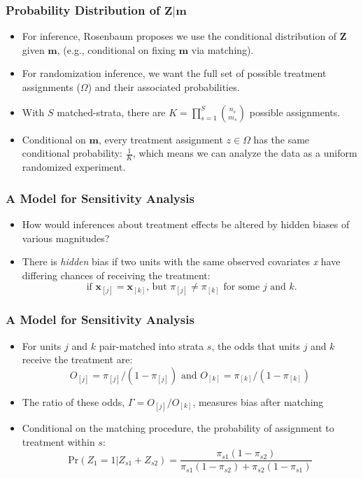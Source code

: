 \documentclass{beamer}
\begin{document}
\begin{frame}
  \frametitle{Probability Distribution of $\mathbf{Z}|\mathbf{m}$}
\begin{itemize}
\item<+-> For inference, Rosenbaum proposes we use the conditional
  distribution of $\mathbf{Z}$ given $\mathbf{m}$, (e.g., conditional on
  fixing $\mathbf{m}$ via matching).
\item<+-> For randomization inference, we want the full set of
  possible treatment assignments ($\Omega$) and their associated
  probabilities.
\item <+->With $S$ matched-strata, there are  $K=\prod_{s=1}^{S} \binom{n_s}{m_s}$
  possible assignments. 
\item<+-> Conditional on $\mathbf{m}$, every treatment assignment $z \in \Omega$ has the
  same conditional probability: $\frac{1}{K}$, which means we can
  analyze the data as a uniform randomized experiment. 
\end{itemize}
\end{frame}

\begin{frame}
  \frametitle{A Model for Sensitivity Analysis}

\begin{itemize}
\item<+->  How would inferences about treatment
  effects be altered by hidden biases of various magnitudes?
\item<+-> There is \emph{hidden} bias if two units with the same observed
  covariates \emph{x} have differing chances of receiving the
  treatment:   
$$\text{ if } \mathbf{x}_{[j]} =
  \mathbf{x}_{[k]}\text{, but }
  \pi_{[j]} \neq \pi_{[k]}\text{  for some }j\text{ and }k\text{.}$$
\end{itemize}
\end{frame}

\begin{frame}
  \frametitle{A Model for Sensitivity Analysis}
\begin{itemize}
\item<+-> For units $j$ and $k$ pair-matched into strata $s$, the odds that units $j$ and
  $k$ receive the treatment are: 
  $$O_{[j]}=\pi_{[j]}/(1-\pi_{[j]})\text{ and }O_{[k]}=\pi_{[k]}/(1-\pi_{[k]})$$
\item<+-> The ratio of these odds, $\Gamma = O_{[j]}/O_{[k]}$, measures bias
  after matching
\item<+-> Conditional on the matching procedure, the probability of
  assignment to treatment within $s$: 
$$\textrm{Pr}(Z_{1}=1|Z_{s1}+Z_{s2}) = \frac{
    \pi_{s1}(1-\pi_{s2})}{\pi_{s1}(1-\pi_{s2}) + \pi_{s2}(1-\pi_{s1})} $$
\end{itemize}
\end{frame}
\end{document}
